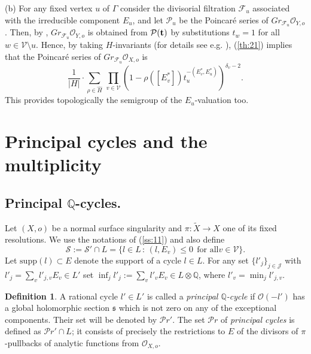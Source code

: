 \documentclass[10pt,a4paper]{amsart}
\numberwithin{equation}{section}
\numberwithin{equation}{subsection}
\theoremstyle{plain}
\theoremstyle{definition}
\newtheorem{definition}[equation]{Definition}
\begin{document}
(b) For any fixed vertex $u$ of $\Gamma$ consider the divisorial
filtration ${\mathcal{F}}_u$ associated with the irreducible component
$E_u$, and let ${\mathcal{P}}_u$ be the Poincar\'e series of
$Gr_{{\mathcal{F}}_u}{\mathcal{O}}_{Y,o}$. Then, by \cite{CDGb}, $Gr_{{\mathcal{F}}_u}{\mathcal{O}}_{Y,o}$
is obtained from ${\mathcal{P}}({{\bf t}})$ by substitutions $t_w=1$ for all
$w\in{\mathcal{V}}\setminus u$. Hence, by taking $H$-invariants (for details
see e.g. \cite{CDGb}), (\ref{th:21}) implies that the Poincar\'e
series of $Gr_{{\mathcal{F}}_u}{\mathcal{O}}_{X,o}$ is
\begin{equation}\label{zeta2}
 \frac{1}{\lvert H \rvert} \cdot \sum_{\rho \in \widehat{H}}\,
 \prod_{v\in{\mathcal{V}}} {(1-\rho([E^*_v])
t_u^{-(E^*_v,E^*_u)})}^{\delta_v-2}.
\end{equation}
This provides topologically the semigroup of the $E_u$-valuation
too.

\section{Principal cycles and the multiplicity}\label{sec:princ}

\subsection{Principal ${\mathbb{Q}}$-cycles.}\label{ss:pqd}
 Let $(X,o)$ be a normal surface singularity and
$\pi:\widetilde{X}\to X$ one of its fixed resolutions. We use the
notations of (\ref{ss:11}) and also define
\begin{equation*}
{\mathcal{S}}:={\mathcal{S}}'\cap L=\{l\in L\,:\, (l,E_v)\leq 0 \ \ \mbox{for all
$v\in {\mathcal{V}}$}\}.
\end{equation*}
Let $\mathrm{supp}(l)\subset E$ denote the support of a cycle
$l\in L$. For any set $\{l'_j\}_{j\in{\mathcal{J}}}$ with
$l'_j=\sum_vl'_{j,v}E_v\in L'$ set $\inf_jl'_j:=\sum_vl'_vE_v\in
L\otimes {\mathbb{Q}}$, where $l'_v=\min_jl'_{j,v}$.
\begin{definition}\label{def:61} A rational cycle $l'\in L'$  is
called a  {\em principal ${\mathbb{Q}}$-cycle} if ${\mathcal{O}}(-l')$ has  a global
holomorphic section ${\mathfrak{s}}$ which is not zero on  any of the
exceptional components. Their set will be denoted by ${\mathcal Pr}'$. The set
${\mathcal Pr}$ of {\em principal cycles} is defined as ${\mathcal Pr}'\cap L$; it
consists of precisely the restrictions to $E$ of the divisors of
$\pi$-pullbacks of analytic functions from ${\mathcal{O}}_{X,o}$.
\end{definition}
\end{document}
